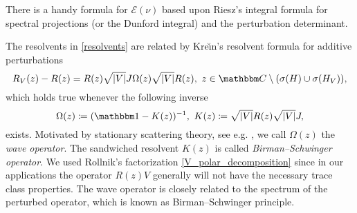 There is a handy formula for $\mathcal{E}(\nu)$ based upon Riesz's integral formula
for spectral projections (or the Dunford integral) and the perturbation determinant.

The resolvents in \eqref{resolvents} are related by Kre\u\i{}n's resolvent formula for additive perturbations
\begin{equation}\label{krein_Omega}
  R_V(z) - R(z) = R(z) \sqrt{|V|} J\Omega(z)\sqrt{|V|} R(z),\ z\in\C\setminus(\sigma(H)\cup\sigma(H_V)) ,
\end{equation}
which holds true whenever the following inverse
\begin{equation}\label{Omega_K}
      \Omega(z) \coloneqq (\id-K(z))^{-1},\ K(z) \coloneqq \sqrt{|V|}R(z)\sqrt{|V|}J ,
\end{equation}
exists. Motivated by stationary scattering theory, see e.g. \cite[3.6.1]{Thirring2002}, we call $\Omega(z)$ the \emph{wave operator}.
The sandwiched resolvent $K(z)$ is called \emph{Birman--Schwinger operator}. We used Rollnik's factorization \eqref{V_polar_decomposition}
since in our applications the operator $R(z)V$ generally will not have the necessary trace class properties.
The wave operator is closely related to the spectrum of the perturbed operator, which is known as Birman--Schwinger principle.

